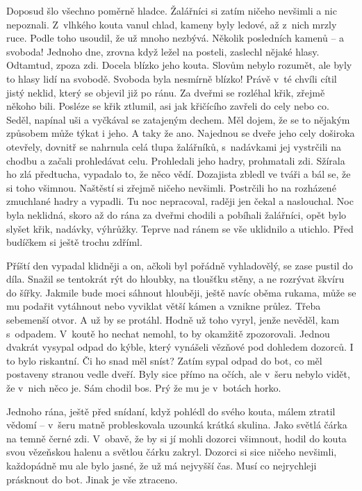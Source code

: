 Doposud šlo všechno poměrně hladce. Žalářníci si zatím ničeho nevšimli a nic nepoznali. Z vlhkého kouta vanul chlad, kameny byly ledové, až z nich mrzly ruce. Podle toho usoudil, že už mnoho nezbývá. Několik posledních kamenů -- a svoboda! Jednoho dne, zrovna když ležel na posteli, zaslechl nějaké hlasy. Odtamtud, zpoza zdi. Docela blízko jeho kouta. Slovům nebylo rozumět, ale byly to hlasy lidí na svobodě. Svoboda byla nesmírně blízko! Právě v té chvíli cítil jistý neklid, který se objevil již po ránu. Za dveřmi se rozléhal křik, zřejmě někoho bili. Posléze se křik ztlumil, asi jak křičícího zavřeli do cely nebo co. Seděl, napínal uši a vyčkával se zatajeným dechem. Měl dojem, že se to nějakým způsobem může týkat i jeho. A taky že ano. Najednou se dveře jeho cely doširoka otevřely, dovnitř se nahrnula celá tlupa žalářníků, s nadávkami jej vystrčili na chodbu a začali prohledávat celu. Prohledali jeho hadry, prohmatali zdi. Sžírala ho zlá předtucha, vypadalo to, že něco vědí. Dozajista zbledl ve tváři a bál se, že si toho všimnou. Naštěstí si zřejmě ničeho nevšimli. Postrčili ho na rozházené zmuchlané hadry a vypadli. Tu noc nepracoval, raději jen čekal a naslouchal. Noc byla neklidná, skoro až do rána za dveřmi chodili a pobíhali žalářníci, opět bylo slyšet křik, nadávky, výhrůžky. Teprve nad ránem se vše uklidnilo a utichlo. Před budíčkem si ještě trochu zdříml.

Příští den vypadal klidněji a on, ačkoli byl pořádně vyhladovělý, se zase pustil do díla. Snažil se tentokrát rýt do hloubky, na tloušťku stěny, a ne rozrývat škvíru do šířky. Jakmile bude moci sáhnout hlouběji, ještě navíc oběma rukama, může se mu podařit vytáhnout nebo vyviklat větší kámen a vznikne průlez. Třeba sebemenší otvor. A už by se protáhl. Hodně už toho vyryl, jenže nevěděl, kam s odpadem. V koutě ho nechat nemohl, to by okamžitě zpozorovali. Jednou dvakrát vysypal odpad do kýble, který vynášeli vězňové pod dohledem dozorců. I to bylo riskantní. Či ho snad měl sníst? Zatím sypal odpad do bot, co měl postaveny stranou vedle dveří. Byly sice přímo na očích, ale v šeru nebylo vidět, že v nich něco je. Sám chodil bos. Prý že mu je v botách horko.

Jednoho rána, ještě před snídaní, když pohlédl do svého kouta, málem ztratil vědomí -- v šeru matně probleskovala uzounká krátká skulina. Jako světlá čárka na temně černé zdi. V obavě, že by si jí mohli dozorci všimnout, hodil do kouta svou vězeňskou halenu a světlou čárku zakryl. Dozorci si sice ničeho nevšimli, každopádně mu ale bylo jasné, že už má nejvyšší čas. Musí co nejrychleji prásknout do bot. Jinak je vše ztraceno.

